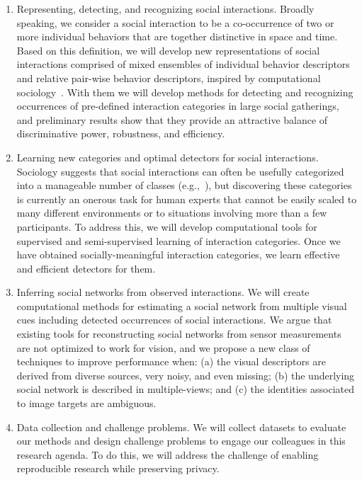 \begin{enumerate}

\item Representing, detecting, and recognizing social interactions. Broadly speaking, we consider a social interaction to be a co-occurrence of two or more individual behaviors that are together distinctive in space and time. Based on this definition, we will develop new representations of social interactions comprised of mixed ensembles of individual behavior descriptors and relative pair-wise behavior descriptors, inspired by computational sociology~\cite{Kendon1990,Lazer2009,Pantic}. With them we will develop methods for detecting and recognizing occurrences of pre-defined interaction categories in large social gatherings, and preliminary results show that they provide an attractive balance of discriminative power, robustness, and efficiency.

\item Learning new categories and optimal detectors for social interactions. Sociology suggests that social interactions can often be usefully categorized into a manageable number of classes (e.g.,~\cite{Kendon1990,Hoyle,Tannen,econo_category,Scherr2009}), but discovering these categories is currently an onerous task for human experts that cannot be easily scaled to many different environments or to situations involving more than a few participants. To address this, we will develop computational tools for supervised and semi-supervised learning of interaction categories. Once we have obtained socially-meaningful interaction categories, we learn effective and efficient detectors for them.

\item Inferring social networks from observed interactions. We will create computational methods for estimating a social network from multiple visual cues including detected occurrences of social interactions. We argue that existing tools for reconstructing social networks from sensor measurements are not optimized to work for vision, and we propose a new class of techniques to improve performance when: (a) the visual descriptors are derived from diverse sources, very noisy, and even missing; (b) the underlying social network is described in multiple-views; and (c) the identities associated to image targets are ambiguous. 

\item Data collection and challenge problems. We will collect datasets to evaluate our methods and design challenge problems to engage our colleagues in this research agenda. To do this, we will address the challenge of enabling reproducible research while preserving privacy.

\end{enumerate}

